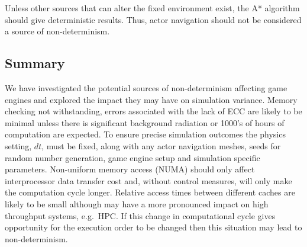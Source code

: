 \documentclass[letterpaper, 10 pt, journal, twoside]{IEEEtran}
\begin{document}
Unless other sources that can alter the fixed environment exist, the A* algorithm should give deterministic results. Thus, actor navigation should not be considered a source of non-determinism.
%
%

\subsection{Summary}
We have investigated the potential sources of non-determinism affecting game engines 
and explored the impact they may have on simulation variance. 
%
%
Memory checking not withstanding, errors associated with the lack of ECC are likely to be minimal unless there is significant background radiation or 1000's of hours of computation are expected.
%
To ensure precise simulation outcomes the physics setting, $dt$, must be fixed, along with any actor navigation meshes, seeds for random number generation, game engine setup and simulation specific parameters.
%
Non-uniform memory access (NUMA) should only affect interprocessor data transfer cost and, without control measures, will only make the computation cycle longer. Relative access times between different caches are likely to be small although may have a more pronounced impact on high throughput systems, e.g.\ HPC. If this change in computational cycle gives opportunity for the execution order to be changed then this situation may lead to non-determinism. 
\end{document}
